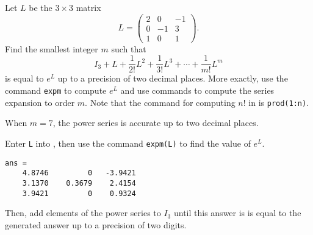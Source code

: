 \documentclass{ximera}
\begin{document}
\begin{computerExercise} \label{c6.2.1}
Let $L$ be the $3\times 3$ matrix
\[
     L = \left(\begin{array}{rrr}
    2 & 0 & -1\\
    0 & -1 & 3\\
    1 & 0 & 1
               \end{array}\right).
\]
Find the smallest integer $m$ such that
\[
  I_3+L+\frac{1}{2!} L^2 + \frac{1}{3!} L^3 + \cdots
  + \frac{1}{m!} L^m
\]
is equal to $e^L$ up to a precision of two decimal places.  More
exactly, use the \Matlab command {\tt expm} to compute $e^L$ and
use \Matlab commands to compute the series expansion to order $m$.  Note
that the command for computing $n!$ in \Matlab is
{\tt prod(1:n)}.

\begin{solution}

\ans When $m = 7$, the power series is accurate up to two decimal places.

\soln Enter {\tt L} into \Matlab, then use the command {\tt expm(L)} to
find the value of $e^L$.
\begin{verbatim}
ans = 
    4.8746         0   -3.9421
    3.1370    0.3679    2.4154
    3.9421         0    0.9324
\end{verbatim}
Then, add elements of the power series to $I_3$ until this answer is
is equal to the \Matlab generated answer up to a precision of two
digits.

\end{solution}
\end{computerExercise}
\end{document}
